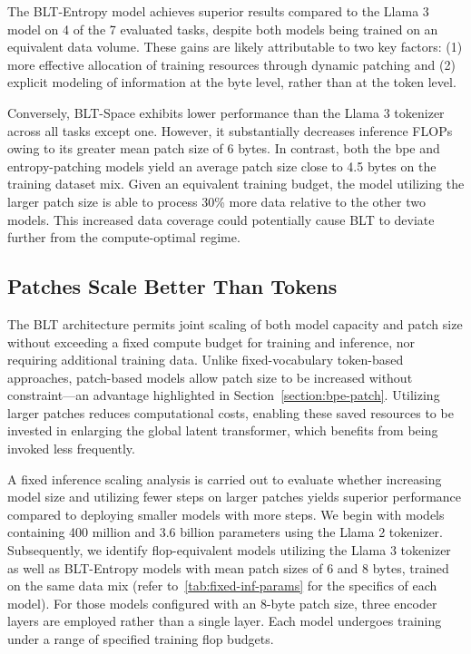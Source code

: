 The {\textsc BLT}-Entropy model achieves superior results compared to the Llama 3 model on 4 of the 7 evaluated tasks, despite both models being trained on an equivalent data volume. These gains are likely attributable to two key factors: (1) more effective allocation of training resources through dynamic patching and (2) explicit modeling of information at the byte level, rather than at the token level.

Conversely, {\textsc BLT}-Space exhibits lower performance than the Llama 3 tokenizer across all tasks except one. However, it substantially decreases inference FLOPs owing to its greater mean patch size of 6 bytes. In contrast, both the bpe and entropy-patching models yield an average patch size close to 4.5 bytes on the training dataset mix. Given an equivalent training budget, the model utilizing the larger patch size is able to process 30\% more data relative to the other two models. This increased data coverage could potentially cause {\textsc BLT} to deviate further from the compute-optimal regime.

\subsection{Patches Scale Better Than Tokens} The {\textsc BLT} architecture permits joint scaling of both model capacity and patch size without exceeding a fixed compute budget for training and inference, nor requiring additional training data. Unlike fixed-vocabulary token-based approaches, patch-based models allow patch size to be increased without constraint—an advantage highlighted in Section~\ref{section:bpe-patch}. Utilizing larger patches reduces computational costs, enabling these saved resources to be invested in enlarging the global latent transformer, which benefits from being invoked less frequently.

A fixed inference scaling analysis is carried out to evaluate whether increasing model size and utilizing fewer steps on larger patches yields superior performance compared to deploying smaller models with more steps. We begin with models containing 400 million and 3.6 billion parameters using the Llama 2 tokenizer. Subsequently, we identify flop-equivalent models utilizing the Llama 3 tokenizer as well as {\textsc BLT}-Entropy models with mean patch sizes of 6 and 8 bytes, trained on the same data mix (refer to~\autoref{tab:fixed-inf-params} for the specifics of each model). For those models configured with an 8-byte patch size, three encoder layers are employed rather than a single layer. Each model undergoes training under a range of specified training flop budgets.

